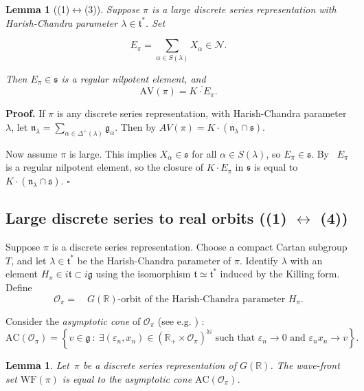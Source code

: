 \documentclass[10pt,leqno]{article}
\newtheorem{lemma}[equation]{Lemma}
\newcommand{\qed}{\hfill $\square$ \medskip}
\newenvironment{proof}[1][Proof]{\noindent\textbf{#1.} }{\qed}
\newcommand{\R}{\mathbb R}
\newcommand{\N}{\mathcal N}
\newcommand{\n}{\mathfrak n}
\renewcommand{\t}{\mathfrak t}
\newcommand{\g}{\mathfrak g}
\newcommand{\s}{\mathfrak s}
\newcommand{\AV}{\mathrm{AV}}
\newcommand{\WF}{\mathrm{WF}}
\newcommand{\AC}{\mathrm{AC}}
\begin{document}
\begin{lemma}[(1)$\leftrightarrow$(3)]\label{l:pi_to_av}
Suppose $\pi$ is a large discrete series representation with Harish-Chandra parameter $\lambda\in\t^*$.
Set

\begin{equation}
  \label{e:Epi}
  E_\pi=\sum_{\alpha\in S(\lambda)}X_\alpha\in \N.
\end{equation}

Then $E_\pi\in\s$ is a regular nilpotent element, and
$$
\AV(\pi)=\overline{K\cdot E_\pi}.
$$
\end{lemma}

\begin{proof}
If $\pi$ is any discrete series representation, with Harish-Chandra parameter $\lambda$, let
$\n_{\lambda}=\sum_{\alpha\in\Delta^+(\lambda)}\g_\alpha$.
Then by \cite[Proposition 6.8]{vogan_irreducibility} $AV(\pi)=K\cdot(\n_\lambda\cap\s)$. 

Now assume $\pi$ is large. This implies $X_\alpha\in\s$ for all $\alpha\in S(\lambda)$, so $E_\pi\in \s$. 
By~\cite{kostant_tds} $E_\pi$ is a regular nilpotent element, so the closure of $K\cdot E_\pi$ in $\s$ is equal to $K\cdot(\n_\lambda\cap\s)$. 
\end{proof}




\subsection{Large discrete series to real orbits ((1) $\leftrightarrow$ (4))}


Suppose $\pi$ is a discrete series representation.
Choose a compact Cartan subgroup $T$, and let $\lambda\in\t^*$ be the Harish-Chandra parameter of $\pi$.
Identify $\lambda$ with an element $H_\pi\in i\t\subset i\g$ using the isomorphism $\t\simeq \t^*$ induced by the Killing form. 
Define
\begin{equation} \label{semisimple_orbit_HC} \mathcal{O}_{\pi}=\quad \text{$G(\R)$-orbit of the Harish-Chandra parameter $H_\pi$}.\end{equation}

Consider the \emph{asymptotic cone} of $\mathcal{O}_\pi$ (see e.g. \cite[Section 3]{AVAV}) :
\[ \AC(\mathcal{O}_\pi) = \left\{ v \in \g \ : \ \text{$\exists (\varepsilon_n, x_n)\in (\R_+ \times \mathcal{O}_\pi)^\mathbb{N}$ such that $\varepsilon_n \to 0$ and $\varepsilon_n x_n \to v$}  \right\}. \]

\begin{lemma} \label{lem:WF_and_AC}
Let~$\pi$ be a discrete series representation of $G(\R)$. The wave-front set $\WF(\pi)$ is equal to the asymptotic cone $\AC(\mathcal{O}_\pi)$.
\end{lemma}
\end{document}
